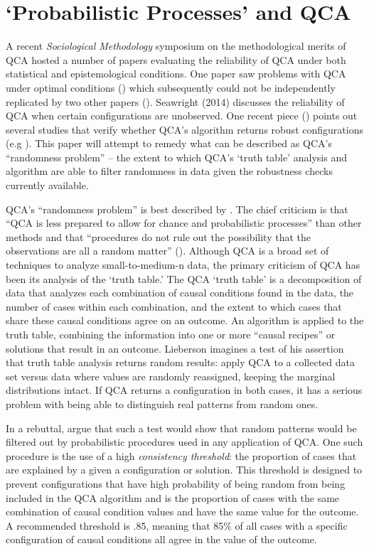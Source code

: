 \documentclass[12pt]{article}
\begin{document}
{\section{`Probabilistic Processes' and QCA}


A recent {\it{Sociological Methodology}} symposium on the methodological merits of QCA hosted a number of papers evaluating the reliability of QCA under both statistical and epistemological conditions. One paper saw problems with QCA under optimal conditions (\citealt{lucas_and_szatrowski_2014}) which subsequently could not be independently replicated by two other papers (\citealt{ragin_2014,vaisey_2014}). Seawright (2014) discusses the reliability of QCA when certain configurations are unobserved. One recent piece (\citealt{collier_2014}) points out several studies that verify whether QCA's algorithm returns robust configurations (e.g \citealt{hug_2013,schneider_and_wagemann_2012,krogslund_et_al_2015}). This paper will attempt to remedy what can be described as QCA's ``randomness problem'' -- the extent to which QCA's `truth table' analysis and algorithm are able to filter randomness in data given the robustness checks currently available. 

QCA's ``randomness problem'' is best described by \citet{lieberson_2004}. The chief criticism is that ``QCA is less prepared to allow for chance and probabilistic processes'' than other methods and that ``procedures do not rule out the possibility that the observations are all a random matter'' (\citealt[13]{lieberson_2004}). Although QCA is a broad set of techniques to analyze small-to-medium-n data, the primary criticism of QCA has been its analysis of the `truth table.' The QCA `truth table' is a decomposition of data that analyzes each combination of causal conditions found in the data, the number of cases within each combination, and the extent to which cases that share these causal conditions agree on an outcome. An algorithm is applied to the truth table, combining the information into one or more ``causal recipes'' or solutions that result in an outcome. Lieberson imagines a test of his assertion that truth table analysis returns random results: apply QCA to a collected data set versus data where values are randomly reassigned, keeping the marginal distributions intact. If QCA returns a configuration in both cases, it has a serious problem with being able to distinguish real patterns from random ones.

In a rebuttal, \citet{rihoux_and_ragin_2009} argue that such a test would show that random patterns would be filtered out by probabilistic procedures used in any application of QCA. One such procedure is the use of a high {\it{consistency threshold}}: the proportion of cases that are explained by a given a configuration or solution. This threshold is designed to prevent configurations that have high probability of being random from being included in the QCA algorithm and is the proportion of cases with the same combination of causal condition values and have the same value for the outcome. A recommended threshold is .85, meaning that 85\% of all cases with a specific configuration of causal conditions all agree in the value of the outcome. 

}
\end{document}
